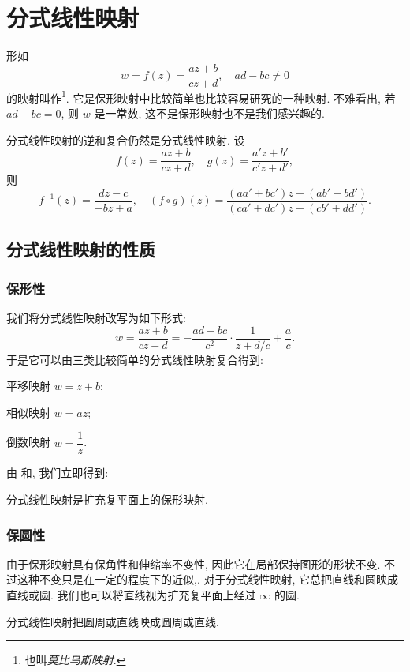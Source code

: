 \section{分式线性映射}

形如
\[
  w=f(z)=\dfrac{az+b}{cz+d},\quad ad-bc\neq 0
\]
的映射叫作\footnote{也叫\emph{莫比乌斯映射}.}.
它是保形映射中比较简单也比较容易研究的一种映射.
不难看出, 若 $ad-bc=0$, 则 $w$ 是一常数, 这不是保形映射也不是我们感兴趣的.

分式线性映射的逆和复合仍然是分式线性映射.
设
\[
  f(z)=\frac{az+b}{cz+d},\quad
  g(z)=\frac{a'z+b'}{c'z+d'},
\]
则
\[
  f^{-1}(z)=\frac{dz-c}{-bz+a},\quad
  (f\circ g)(z)=\frac{(aa'+bc')z+(ab'+bd')}{(ca'+dc')z+(cb'+dd')}.
\]

\subsection{分式线性映射的性质}

\subsubsection{保形性}

我们将分式线性映射改写为如下形式:
\[
   w
  =\frac{az+b}{cz+d}
  =-\frac{ad-bc}{c^2}\cdot\frac1{z+d/c}+\frac ac.
\]
于是它可以由三类比较简单的分式线性映射复合得到:
\begin{enumpar}
  \item 平移映射 $w=z+b$;
  \item 相似映射 $w=az$;
  \item 倒数映射 $w=\dfrac1z$.
\end{enumpar}
由 和, 我们立即得到:

\begin{theorem}
  分式线性映射是扩充复平面上的保形映射.
\end{theorem}


\subsubsection{保圆性}

由于保形映射具有保角性和伸缩率不变性, 因此它在局部保持图形的形状不变.
不过这种不变只是在一定的程度下的近似,.
对于分式线性映射, 它总把直线和圆映成直线或圆.
我们也可以将直线视为扩充复平面上经过 $\infty$ 的圆.

\begin{theorem}
  分式线性映射把圆周或直线映成圆周或直线.
\end{theorem}

